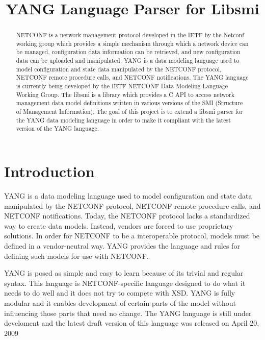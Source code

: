 \documentclass[conference]{IEEEtran}
\begin{document}
\title{YANG Language Parser for Libsmi}
\author{
}

\maketitle

\begin{abstract}
NETCONF is a network management protocol developed in the IETF by the Netconf working group  which provides a simple mechanism through which a network device can be managed, configuration data information can be retrieved, and new configuration data can be uploaded and manipulated. YANG is a data modeling language used to model configuration and state data manipulated by the NETCONF protocol, NETCONF remote procedure calls, and NETCONF notifications. The YANG language is currently being developed by the IETF NETCONF Data Modeling Language Working Group. The libsmi is a library which provides a C API to access network management data model definitions written in various versions of the SMI (Structure of Management Information). The goal of this project is to extend a libsmi parser for the YANG data modeling language in order to make it compliant with the latest version of the YANG language.
\end{abstract}

\section{Introduction}
YANG is a data modeling language used to model configuration and state data manipulated by the NETCONF protocol, NETCONF remote procedure calls, and NETCONF notifications. Today, the NETCONF protocol \cite{bib1} lacks a standardized way to create data models. Instead, vendors are forced to use proprietary solutions. In order for NETCONF to be a interoperable protocol, models must be defined in a vendor-neutral way. YANG provides the language and rules for defining such models for use with NETCONF. 

YANG is posed as simple and easy to learn because of its trivial and regular syntax. This language is NETCONF-specific language designed to do what it needs to do well and it does not try to compete with XSD. YANG is fully modular and it enables development of certain parts of the model without influencing those parts that need no change. The YANG language is still under develoment and the latest draft version of this language was released on April 20, 2009 
\end{document}
